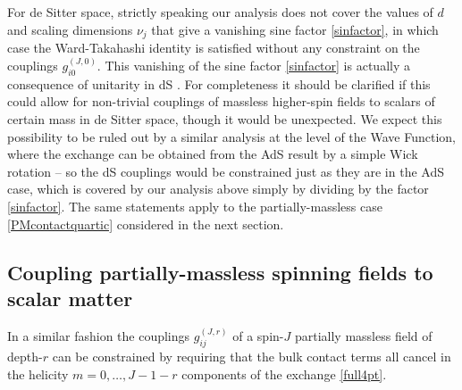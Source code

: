 \documentclass[11pt,a4paper]{article}
\begin{document}
For de Sitter space, strictly speaking our analysis does not cover the values of $d$ and scaling dimensions $\nu_j$ that give a vanishing sine factor \eqref{sinfactor}, in which case the Ward-Takahashi identity is satisfied without any constraint on the couplings $g^{\left(J,0\right)}_{i0}$. This vanishing of the sine factor \eqref{sinfactor} is actually a consequence of unitarity in dS \cite{Goodhew:2020hob}. For completeness it should be clarified if this could allow for non-trivial couplings of massless higher-spin fields to scalars of certain mass in de Sitter space, though it would be unexpected. We expect this possibility to be ruled out by a similar analysis at the level of the Wave Function, where the exchange can be obtained from the AdS result by a simple Wick rotation \cite{Maldacena:2002vr} -- so the dS couplings would be constrained just as they are in the AdS case, which is covered by our analysis above simply by dividing by the factor \eqref{sinfactor}. The same statements apply to the partially-massless case \eqref{PMcontactquartic} considered in the next section.


\subsection{Coupling partially-massless spinning fields to scalar matter}
\label{subsec::pmcouplings}

In a similar fashion the couplings $g^{\left(J,r\right)}_{ij}$ of a spin-$J$ partially massless field of depth-$r$ can be constrained by requiring that the bulk contact terms all cancel in the helicity $m=0,\ldots,J-1-r$ components of the exchange \eqref{full4pt}. 
\end{document}
